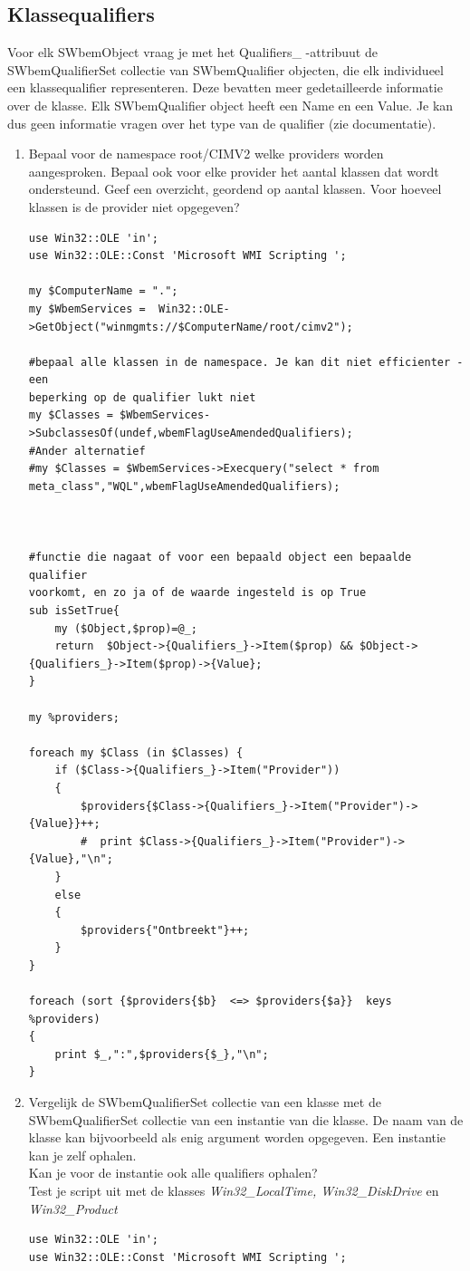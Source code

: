 \documentclass[11pt,a4paper]{report}
\begin{document}
\subsection{Klassequalifiers}
Voor elk SWbemObject vraag je met het Qualifiers\_ -attribuut de SWbemQualifierSet collectie van SWbemQualifier objecten, die elk individueel een klassequalifier representeren. Deze bevatten meer gedetailleerde informatie over de klasse. Elk SWbemQualifier object heeft een Name en een Value. Je kan dus geen informatie vragen over het type van de qualifier (zie documentatie).
\begin{enumerate}[resume]
	\item Bepaal voor de namespace root/CIMV2 welke providers worden aangesproken. Bepaal ook voor elke provider het aantal klassen dat wordt ondersteund. Geef een overzicht, geordend op aantal klassen.
	Voor hoeveel klassen is de provider niet opgegeven?
	\begin{lstlisting}
use Win32::OLE 'in';
use Win32::OLE::Const 'Microsoft WMI Scripting ';

my $ComputerName = ".";
my $WbemServices =  Win32::OLE->GetObject("winmgmts://$ComputerName/root/cimv2");

#bepaal alle klassen in de namespace. Je kan dit niet efficienter - een 
beperking op de qualifier lukt niet
my $Classes = $WbemServices->SubclassesOf(undef,wbemFlagUseAmendedQualifiers);
#Ander alternatief
#my $Classes = $WbemServices->Execquery("select * from meta_class","WQL",wbemFlagUseAmendedQualifiers);



#functie die nagaat of voor een bepaald object een bepaalde qualifier 
voorkomt, en zo ja of de waarde ingesteld is op True
sub isSetTrue{
	my ($Object,$prop)=@_;
	return  $Object->{Qualifiers_}->Item($prop) && $Object->{Qualifiers_}->Item($prop)->{Value};
}

my %providers;

foreach my $Class (in $Classes) {
	if ($Class->{Qualifiers_}->Item("Provider"))
	{
		$providers{$Class->{Qualifiers_}->Item("Provider")->{Value}}++;
		#  print $Class->{Qualifiers_}->Item("Provider")->{Value},"\n";
	}
	else
	{
		$providers{"Ontbreekt"}++;
	}
}

foreach (sort {$providers{$b}  <=> $providers{$a}}  keys %providers)
{
	print $_,":",$providers{$_},"\n";
}
	\end{lstlisting}
	\item Vergelijk de SWbemQualifierSet collectie van een klasse met de SWbemQualifierSet collectie van een instantie van die klasse. De naam van de klasse kan bijvoorbeeld als enig argument worden opgegeven. Een instantie kan je zelf ophalen.
	\\Kan je voor de instantie ook alle qualifiers ophalen?
	\\Test je script uit met de klasses \textit{Win32\_LocalTime, Win32\_DiskDrive} en \textit{Win32\_Product}
	\begin{lstlisting}
use Win32::OLE 'in';
use Win32::OLE::Const 'Microsoft WMI Scripting ';


\end{lstlisting}
\end{enumerate}
\end{document}
